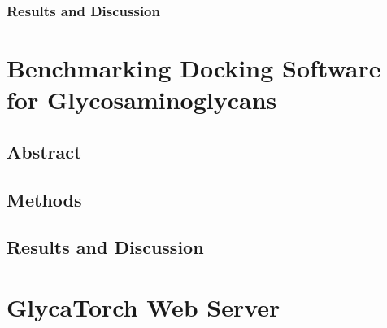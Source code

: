 \documentclass[a4paper, 12pt, openany]{book}
\begin{document}
\subsection{Results and Discussion}

\chapter{Benchmarking Docking Software for Glycosaminoglycans}
\section{Abstract}
\section{Methods}
\section{Results and Discussion}

\chapter{GlycaTorch Web Server}



\newpage
{

}

\end{document}
